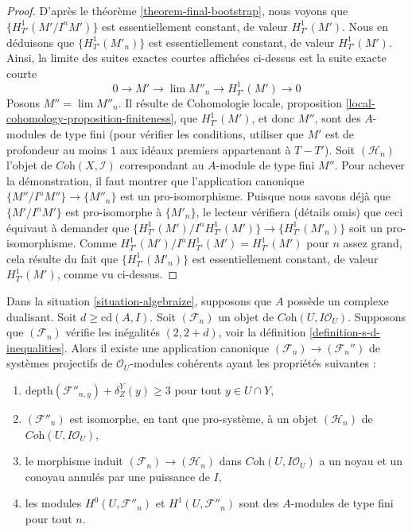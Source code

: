 \begin{proof}
\medskip\noindent
D'après le théorème \ref{theorem-final-bootstrap}, nous voyons que $\{H^1_{T'}(M'/I^nM')\}$
est essentiellement constant, de valeur $H^1_{T'}(M')$. Nous en déduisons que
$\{H^1_{T'}(M'_n)\}$ est essentiellement constant, de valeur $H^1_{T'}(M')$.
Ainsi, la limite des suites exactes courtes affichées ci-dessus
est la suite exacte courte
$$
0 \to M' \to \lim M''_n \to H^1_{T'}(M') \to 0
$$
Posons $M'' = \lim M''_n$. Il résulte de
Cohomologie locale, proposition \ref{local-cohomology-proposition-finiteness},
que $H^1_{T'}(M')$, et donc $M''$, sont des $A$-modules de type fini (pour vérifier les
conditions, utiliser que $M'$ est de profondeur au moins $1$ aux idéaux premiers appartenant à $T - T'$).
Soit $(\mathcal{H}_n)$ l'objet de $\textit{Coh}(X, \mathcal{I})$
correspondant au $A$-module de type fini $M''$. Pour achever la démonstration, il faut
montrer que l'application canonique $\{M''/I^nM''\} \to \{M''_n\}$ est un
pro-isomorphisme. Puisque nous savons déjà que $\{M'/I^nM'\}$ est pro-isomorphe
à $\{M'_n\}$, le lecteur vérifiera (détails omis) que ceci équivaut à demander que
$\{H^1_{T'}(M')/I^nH^1_{T'}(M')\} \to \{H^1_{T'}(M'_n)\}$
soit un pro-isomorphisme. Comme $H^1_{T'}(M')/I^nH^1_{T'}(M') = H^1_{T'}(M')$
pour $n$ assez grand, cela résulte du fait que $\{H^1_{T'}(M'_n)\}$
est essentiellement constant, de valeur $H^1_{T'}(M')$, comme vu ci-dessus.
\end{proof}

\begin{lemma}
\label{lemma-improvement-application}
Dans la situation \ref{situation-algebraize}, supposons que $A$ possède
un complexe dualisant. Soit $d \geq \text{cd}(A, I)$. Soit $(\mathcal{F}_n)$
un objet de $\textit{Coh}(U, I\mathcal{O}_U)$. Supposons que
$(\mathcal{F}_n)$ vérifie les inégalités $(2, 2 + d)$, voir la
définition \ref{definition-s-d-inequalities}.
Alors il existe une application canonique $(\mathcal{F}_n) \to (\mathcal{F}_n'')$
de systèmes projectifs de $\mathcal{O}_U$-modules cohérents
ayant les propriétés suivantes :
\begin{enumerate}
\item $\text{depth}(\mathcal{F}''_{n, y}) + \delta^Y_Z(y) \geq 3$
pour tout $y \in U \cap Y$,
\item $(\mathcal{F}''_n)$ est isomorphe, en tant que pro-système, à un objet
$(\mathcal{H}_n)$ de $\textit{Coh}(U, I\mathcal{O}_U)$,
\item le morphisme induit $(\mathcal{F}_n) \to (\mathcal{H}_n)$ dans
$\textit{Coh}(U, I\mathcal{O}_U)$ a un noyau et un conoyau
annulés par une puissance de $I$,
\item les modules $H^0(U, \mathcal{F}''_n)$ et $H^1(U, \mathcal{F}''_n)$
sont des $A$-modules de type fini pour tout $n$.
\end{enumerate}
\end{lemma}

